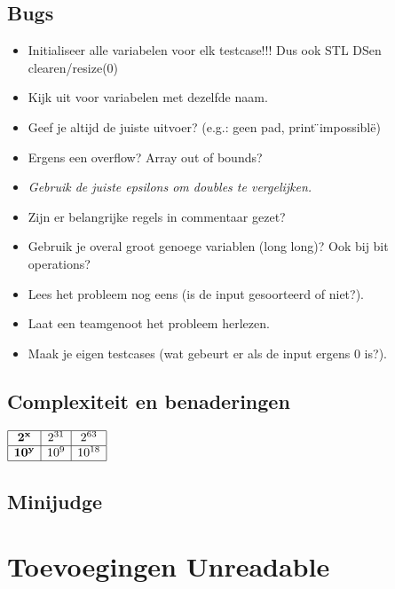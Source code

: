 \documentclass[10pt,a4paper,titlepage]{article}
\DeclareMathOperator{\bigO}{\mathcal{O}}
\renewcommand{\O}{\mathcal{O}}
\begin{document}
\subsection{Bugs}
\begin{multicols}{2}
\begin{itemize}[noitemsep,nolistsep]
\item Initialiseer alle variabelen voor elk testcase!!! Dus ook STL DSen clearen/resize(0)
\item Kijk uit voor variabelen met dezelfde naam.
\item Geef je altijd de juiste uitvoer? (e.g.: geen pad, print \"{}impossible\"{})
\item Ergens een overflow? Array out of bounds?
\item \emph{Gebruik de juiste epsilons om doubles te vergelijken.}
\item Zijn er belangrijke regels in commentaar gezet?%
\item Gebruik je overal groot genoege variablen (long long)? Ook bij bit operations?
\item Lees het probleem nog eens (is de input gesoorteerd of niet?).
\item Laat een teamgenoot het probleem herlezen.
\item Maak je eigen testcases (wat gebeurt er als de input ergens 0 is?).
\end{itemize}

\iftrue
\subsection{Complexiteit en benaderingen}
$\begin{array}{|c|c|c|c|}
\hline
\mathbf{2^x} & 2^{31} & 2^{63} \\ \hline
\mathbf{10^y} & 10^{9} & 10^{18} \\ \hline
\end{array}$
\fi
\end{multicols}
\iftrue
\subsection{Minijudge}


\fi


\renewcommand{\bigO}[1]{$\O(#1)$}

\section{Toevoegingen Unreadable}
\end{document}
